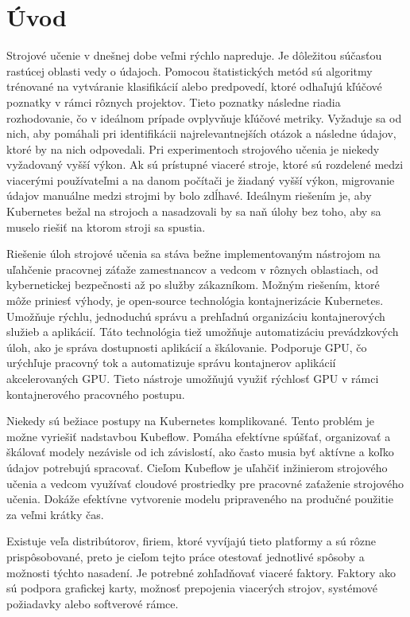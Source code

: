 
{}

\chapter*{Úvod}

Strojové učenie v dnešnej dobe veľmi rýchlo napreduje. Je dôležitou súčasťou rastúcej oblasti vedy o údajoch. Pomocou štatistických metód sú algoritmy trénované na vytváranie klasifikácií alebo predpovedí, ktoré odhaľujú kľúčové poznatky v rámci rôznych projektov. Tieto poznatky následne riadia rozhodovanie, čo v ideálnom prípade ovplyvňuje kľúčové metriky. Vyžaduje sa od nich, aby pomáhali pri identifikácii najrelevantnejších otázok a následne údajov, ktoré by na nich odpovedali. Pri experimentoch strojového učenia je niekedy vyžadovaný vyšší výkon. Ak sú prístupné viaceré stroje, ktoré sú rozdelené medzi viacerými používateľmi a na danom počítači je žiadaný vyšší výkon, migrovanie údajov manuálne medzi strojmi by bolo zdĺhavé. Ideálnym riešením je, aby Kubernetes bežal na strojoch a nasadzovali by sa naň úlohy bez toho, aby sa muselo riešiť na ktorom stroji sa spustia.

Riešenie úloh strojové učenia sa stáva bežne implementovaným nástrojom na uľahčenie pracovnej záťaže zamestnancov a vedcom v rôznych oblastiach, od kybernetickej bezpečnosti až po služby zákazníkom. Možným riešením, ktoré môže priniesť výhody, je open-source technológia kontajnerizácie Kubernetes. Umožňuje rýchlu, jednoduchú správu a prehľadnú organizáciu kontajnerových služieb a aplikácií. Táto technológia tiež umožňuje automatizáciu prevádzkových úloh, ako je správa dostupnosti aplikácií a škálovanie. Podporuje GPU, čo urýchľuje pracovný tok a automatizuje správu kontajnerov aplikácií akcelerovaných GPU. Tieto nástroje umožňujú využiť rýchlosť GPU v rámci kontajnerového pracovného postupu.

Niekedy sú bežiace postupy na Kubernetes komplikované. Tento problém je možne vyriešiť nadstavbou Kubeflow. Pomáha efektívne spúšťať, organizovať a škálovať modely nezávisle od ich závislostí, ako často musia byť aktívne a koľko údajov potrebujú spracovať. Cieľom Kubeflow je uľahčiť inžinierom strojového učenia a vedcom využívať cloudové prostriedky pre pracovné zaťaženie strojového učenia. Dokáže efektívne vytvorenie modelu pripraveného na produčné použitie za veľmi krátky čas.

Existuje veľa distribútorov, firiem, ktoré vyvíjajú tieto platformy a sú rôzne prispôsobované, preto je cieľom tejto práce otestovať jednotlivé spôsoby a možnosti týchto nasadení. Je potrebné zohľadňovať viaceré faktory. Faktory ako sú podpora grafickej karty, možnosť prepojenia viacerých strojov, systémové požiadavky alebo softverové rámce.

